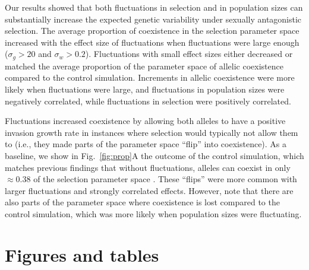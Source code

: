 \documentclass[12pt]{article}
\begin{document}
Our results showed that both fluctuations in selection and in population sizes can substantially increase the expected genetic variability under sexually antagonistic selection. The average proportion of coexistence in the selection parameter space increased with the effect size of fluctuations when fluctuations were large enough ($\sigma_{g} > 20$ and $\sigma_{w} > 0.2$). Fluctuations with small effect sizes either decreased or matched the average proportion of the parameter space of allelic coexistence compared to the control simulation.  Increments in allelic coexistence were more likely when fluctuations were large, and fluctuations in population sizes were negatively correlated, while fluctuations in selection were positively correlated.

Fluctuations increased coexistence by allowing both alleles to have a positive invasion growth rate in instances where selection would typically not allow them to (i.e., they made parts of the parameter space ``flip'' into coexistence).  As a baseline, we show in Fig.~\ref{fig:prop}A the outcome of the control simulation, which matches previous findings that without fluctuations, alleles can coexist in only $\approx 0.38$ of the selection parameter space \citep{connallon2018environmental}. These ``flips'' were more common with larger fluctuations and strongly correlated effects. However, note that there are also parts of the parameter space where coexistence is lost compared to the control simulation, which was more likely when population sizes were fluctuating.  





\clearpage
\section*{Figures and tables }
\end{document}
